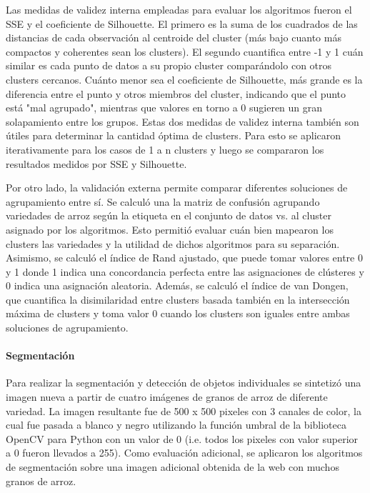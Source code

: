 \documentclass{article}
\begin{document}
Las medidas de validez interna empleadas para evaluar los algoritmos fueron el SSE y el coeficiente de Silhouette.
El primero es la suma de los cuadrados de las distancias de cada observación al centroide del cluster (más bajo cuanto más compactos y coherentes sean los clusters). 
El segundo cuantifica entre -1 y 1 cuán similar es cada punto de datos a su propio cluster comparándolo con otros clusters cercanos.
Cuánto menor sea el coeficiente de Silhouette, más grande es la diferencia entre el punto y otros miembros del cluster, indicando que el punto está "mal agrupado", mientras que valores en torno a 0 sugieren un gran solapamiento entre los grupos.
Estas dos medidas de validez interna también son útiles para determinar la cantidad óptima de clusters.
Para esto se aplicaron iterativamente para los casos de 1 a n clusters y luego se compararon los resultados medidos por SSE y Silhouette. 

Por otro lado, la validación externa permite comparar diferentes soluciones de agrupamiento entre sí. Se calculó una la matriz de confusión agrupando variedades de arroz según la etiqueta en el conjunto de datos vs. al cluster asignado por los algoritmos.
Esto permitió evaluar cuán bien mapearon los clusters las variedades y la utilidad de dichos algoritmos para su separación. Asimismo, se calculó el índice de Rand ajustado, que puede tomar valores entre 0 y 1 donde 1 indica una concordancia perfecta entre las asignaciones de clústeres y 0 indica una asignación aleatoria. Además, se calculó el índice de van Dongen, que cuantifica la disimilaridad entre clusters basada también en la intersección máxima de clusters y toma valor 0 cuando los clusters son iguales entre ambas soluciones de agrupamiento.


\paragraph{Segmentación}
Para realizar la segmentación y detección de objetos individuales se sintetizó una imagen nueva a partir de cuatro imágenes de granos de arroz de diferente variedad. 
La imagen resultante fue de 500 x 500 pixeles con 3 canales de color, la cual fue pasada a blanco y negro utilizando la función umbral de la biblioteca OpenCV para Python con un valor de 0 (i.e. todos los pixeles con valor superior a 0 fueron llevados a 255).
Como evaluación adicional, se aplicaron los algoritmos de segmentación sobre una imagen adicional obtenida de la web con muchos granos de arroz.
\end{document}
